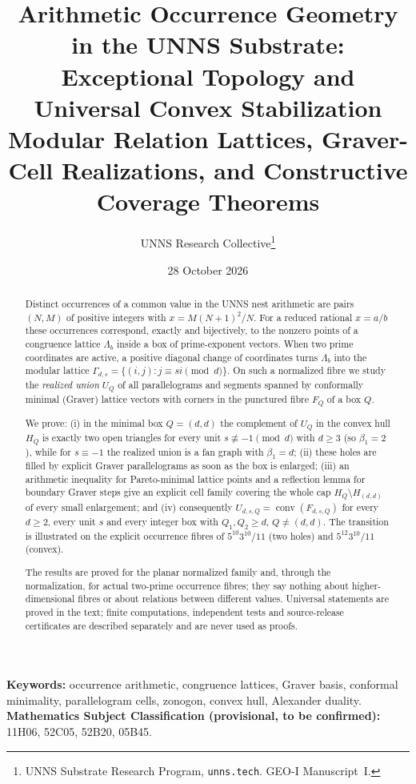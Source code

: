 \documentclass[11pt]{article}
\title{Arithmetic Occurrence Geometry in the UNNS Substrate:\\
Exceptional Topology and Universal Convex Stabilization\\[2pt]
\large Modular Relation Lattices, Graver-Cell Realizations, and Constructive Coverage Theorems}
\author{UNNS Research Collective\thanks{UNNS Substrate Research Program, \texttt{unns.tech}. GEO-I Manuscript~I.}}
\date{28 October 2026}
\theoremstyle{definition}
\theoremstyle{remark}
\newcommand{\conv}{\operatorname{conv}}
\begin{document}
\maketitle

\begin{abstract}
\noindent Distinct occurrences of a common value in the UNNS nest arithmetic are pairs $(N,M)$ of positive integers with $x=M(N+1)^2/N$. For a reduced rational $x=a/b$ these occurrences correspond, exactly and bijectively, to the nonzero points of a congruence lattice $\Lambda_b$ inside a box of prime-exponent vectors. When two prime coordinates are active, a positive diagonal change of coordinates turns $\Lambda_b$ into the modular lattice $\Gamma_{d,s}=\{(i,j):j\equiv si \pmod d\}$. On such a normalized fibre we study the \emph{realized union} $U_Q$ of all parallelograms and segments spanned by conformally minimal (Graver) lattice vectors with corners in the punctured fibre $F_Q$ of a box $Q$.

We prove: (i) in the minimal box $Q=(d,d)$ the complement of $U_Q$ in the convex hull $H_Q$ is exactly two open triangles for every unit $s\not\equiv-1 \pmod d$ with $d\ge 3$ (so $\beta_1=2$), while for $s\equiv-1$ the realized union is a fan graph with $\beta_1=d$; (ii) these holes are filled by explicit Graver parallelograms as soon as the box is enlarged; (iii) an arithmetic inequality for Pareto-minimal lattice points and a reflection lemma for boundary Graver steps give an explicit cell family covering the whole cap $H_Q\setminus H_{(d,d)}$ of every small enlargement; and (iv) consequently $U_{d,s,Q}=\conv(F_{d,s,Q})$ for every $d\ge2$, every unit $s$ and every integer box with $Q_1,Q_2\ge d$, $Q\neq(d,d)$. The transition is illustrated on the explicit occurrence fibres of $5^{10}3^{10}/11$ (two holes) and $5^{12}3^{10}/11$ (convex).

The results are proved for the planar normalized family and, through the normalization, for actual two-prime occurrence fibres; they say nothing about higher-dimensional fibres or about relations between different values. Universal statements are proved in the text; finite computations, independent tests and source-release certificates are described separately and are never used as proofs.
\end{abstract}

\medskip\noindent\textbf{Keywords:} occurrence arithmetic, congruence lattices, Graver basis, conformal minimality, parallelogram cells, zonogon, convex hull, Alexander duality.\\
\textbf{Mathematics Subject Classification (provisional, to be confirmed):} 11H06, 52C05, 52B20, 05B45.

\tableofcontents
\clearpage








\appendix


\end{document}
